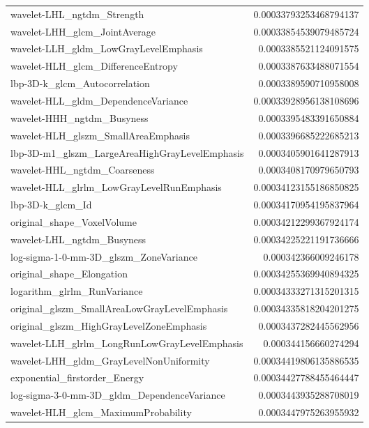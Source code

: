 {\begin{xltabular}[H]{\textwidth}{X r}
        wavelet-LHL\_ngtdm\_Strength & 0.00033793253468794137 \\
        wavelet-LHH\_glcm\_JointAverage & 0.00033854539079485724 \\
        wavelet-LLH\_gldm\_LowGrayLevelEmphasis & 0.0003385521124091575 \\
        wavelet-HLH\_glcm\_DifferenceEntropy & 0.0003387633488071554 \\
        lbp-3D-k\_glcm\_Autocorrelation & 0.0003389590710958008 \\
        wavelet-HLL\_gldm\_DependenceVariance & 0.00033928956138108696 \\
        wavelet-HHH\_ngtdm\_Busyness & 0.0003395483391650884 \\
        wavelet-HLH\_glszm\_SmallAreaEmphasis & 0.0003396685222685213 \\
        lbp-3D-m1\_glszm\_LargeAreaHighGrayLevelEmphasis & 0.0003405901641287913 \\
        wavelet-HHL\_ngtdm\_Coarseness & 0.0003408170979650793 \\
        wavelet-HLL\_glrlm\_LowGrayLevelRunEmphasis & 0.00034123155186850825 \\
        lbp-3D-k\_glcm\_Id & 0.00034170954195837964 \\
        original\_shape\_VoxelVolume & 0.00034212299367924174 \\
        wavelet-LHL\_ngtdm\_Busyness & 0.00034225221191736666 \\
        log-sigma-1-0-mm-3D\_glszm\_ZoneVariance & 0.000342366009246178 \\
        original\_shape\_Elongation & 0.00034255369940894325 \\
        logarithm\_glrlm\_RunVariance & 0.00034333271315201315 \\
        original\_glszm\_SmallAreaLowGrayLevelEmphasis & 0.00034335818204201275 \\
        original\_glszm\_HighGrayLevelZoneEmphasis & 0.0003437282445562956 \\
        wavelet-LLH\_glrlm\_LongRunLowGrayLevelEmphasis & 0.000344156660274294 \\
        wavelet-LHH\_gldm\_GrayLevelNonUniformity & 0.00034419806135886535 \\
        exponential\_firstorder\_Energy & 0.00034427788455464447 \\
        log-sigma-3-0-mm-3D\_gldm\_DependenceVariance & 0.0003443935288708019 \\
        wavelet-HLH\_glcm\_MaximumProbability & 0.0003447975263955932 \\

\end{xltabular}}
